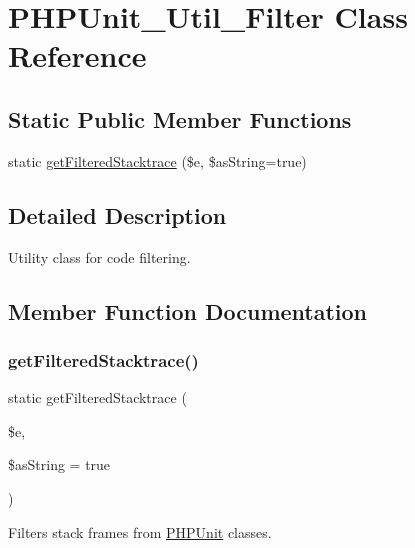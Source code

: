 \hypertarget{class_p_h_p_unit___util___filter}{}\section{P\+H\+P\+Unit\+\_\+\+Util\+\_\+\+Filter Class Reference}
\label{class_p_h_p_unit___util___filter}
\subsection*{Static Public Member Functions}
\begin{DoxyCompactItemize}
\item 
static \mbox{\hyperlink{class_p_h_p_unit___util___filter_a738fd2b301ad120f90b805acd57e3d7b}{get\+Filtered\+Stacktrace}} (\$e, \$as\+String=true)
\end{DoxyCompactItemize}


\subsection{Detailed Description}
Utility class for code filtering. 

\subsection{Member Function Documentation}
\mbox{\label{class_p_h_p_unit___util___filter_a738fd2b301ad120f90b805acd57e3d7b}} 
\subsubsection{\texorpdfstring{get\+Filtered\+Stacktrace()}{getFilteredStacktrace()}}
{\footnotesize\ttfamily static get\+Filtered\+Stacktrace (\begin{DoxyParamCaption}\item[{}]{\$e,  }\item[{}]{\$as\+String = {\ttfamily true} }\end{DoxyParamCaption})\hspace{0.3cm}{\ttfamily [static]}}

Filters stack frames from \mbox{\hyperlink{namespace_p_h_p_unit}{P\+H\+P\+Unit}} classes.


